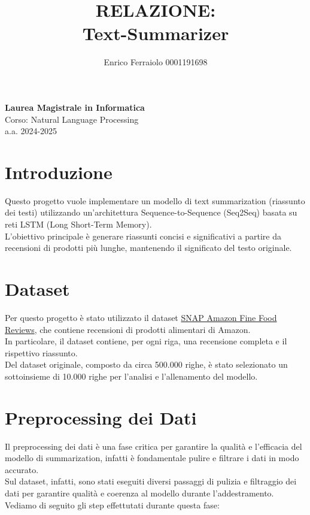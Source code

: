 \documentclass[a4paper, 12pt]{article}
\title{\textbf{RELAZIONE: \\ Text-Summarizer}}
\author{Enrico Ferraiolo 0001191698}
\date{}
\begin{document}
\maketitle

\begin{center}
    \textbf{Laurea Magistrale in Informatica}\\
    \vspace{0.3cm}
    Corso: Natural Language Processing \\
    a.a. 2024-2025
    \vspace{2cm}
\end{center}

\newpage

\tableofcontents
\newpage

\section{Introduzione}
Questo progetto vuole implementare un modello di text summarization (riassunto dei testi) utilizzando un'architettura Sequence-to-Sequence (Seq2Seq) basata su reti LSTM (Long Short-Term Memory).\\
L'obiettivo principale è generare riassunti concisi e significativi a partire da recensioni di prodotti più lunghe, mantenendo il significato del testo originale.

\section{Dataset}
Per questo progetto è stato utilizzato il dataset \href{https://www.kaggle.com/datasets/snap/amazon-fine-food-reviews}{SNAP Amazon Fine Food Reviews}, che contiene recensioni di prodotti alimentari di Amazon.\\
In particolare, il dataset contiene, per ogni riga, una recensione completa e il rispettivo riassunto.\\
Del dataset originale, composto da circa 500.000 righe, è stato selezionato un sottoinsieme di 10.000 righe per l'analisi e l'allenamento del modello.

\section{Preprocessing dei Dati}
Il preprocessing dei dati è una fase critica per garantire la qualità e l'efficacia del modello di summarization, infatti è fondamentale pulire e filtrare i dati in modo accurato.\\
Sul dataset, infatti, sono stati eseguiti diversi passaggi di pulizia e filtraggio dei dati per garantire qualità e coerenza al modello durante l'addestramento.\\
Vediamo di seguito gli step effettutati durante questa fase:
\end{document}
